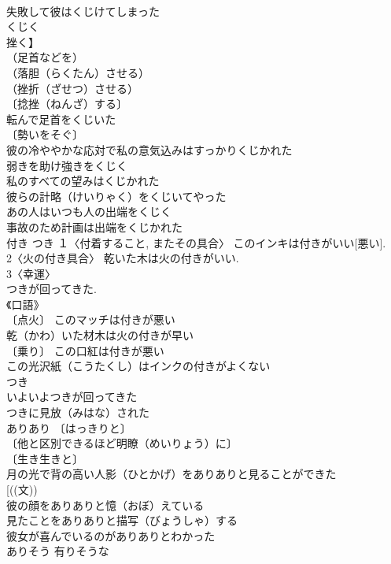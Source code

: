 \documentclass[8pt]{extreport}
\begin{document}
\begin{CJK}{UTF8}{min}
\\	失敗して彼はくじけてしまった 
\\	くじく	
\\	挫く】	
\\	（足首などを）
\\	（落胆（らくたん）させる）
\\	（挫折（ざせつ）させる）
\\	〔捻挫（ねんざ）する〕
\\	転んで足首をくじいた 
\\	〔勢いをそぐ〕
\\	彼の冷ややかな応対で私の意気込みはすっかりくじかれた 
\\	弱きを助け強きをくじく 
\\	私のすべての望みはくじかれた 
\\	彼らの計略（けいりゃく）をくじいてやった 
\\	あの人はいつも人の出端をくじく 
\\	事故のため計画は出端をくじかれた 
\\	付き	つき	１〈付着すること, またその具合〉 このインキは付きがいい[悪い]. 
\\	2〈火の付き具合〉 乾いた木は火の付きがいい. 
\\	3〈幸運〉 
\\	つきが回ってきた. 
\\	《口語》 
\\	〔点火〕 このマッチは付きが悪い 
\\	乾（かわ）いた材木は火の付きが早い 
\\	〔乗り〕 この口紅は付きが悪い 
\\	この光沢紙（こうたくし）はインクの付きがよくない 
\\	つき		
\\	いよいよつきが回ってきた 
\\	つきに見放（みはな）された 
\\	ありあり		〔はっきりと〕
\\	〔他と区別できるほど明瞭（めいりょう）に〕
\\	〔生き生きと〕
\\	月の光で背の高い人影（ひとかげ）をありありと見ることができた 
\\	[((文)) 
\\	彼の顔をありありと憶（おぼ）えている 
\\	見たことをありありと描写（びょうしゃ）する 
\\	彼女が喜んでいるのがありありとわかった 
\\	ありそう	有りそうな	

\end{CJK}
\end{document}
